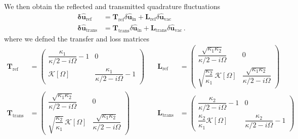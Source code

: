 We then obtain the reflected and transmitted quadrature fluctuations 
\begin{equation}
\begin{split}
\mathbf{\delta \hat{u}_{\mathrm{ref}}} &= 
\mathbf{T}_{\mathrm{ref}}
\delta\hat{\mathbf u}_{\mathrm{in}} + 
\mathbf{L}_{\mathrm{ref}}
\delta\hat{\mathbf u}_{\mathrm{vac}} \, \\ 
\mathbf{\delta \hat{u}_{\mathrm{trans}}} &= \mathbf{T}_{\mathrm{trans}}  \delta\hat{\mathbf u}_{\mathrm{in}} +
\mathbf{L}_{\mathrm{trans}}
\delta\hat{\mathbf u}_{\mathrm{vac}} \, .
\end{split}
\end{equation}
 where we defned the transfer and loss  matrices 
\begin{equation*}
  \begin{alignedat}{3}
     \mathbf{T}_{\mathrm{ref}} &=\begin{pmatrix}
  \dfrac{\kappa_1}{\kappa/2-i\Omega}  -1  & 0 \\
  \mathcal{K}[\Omega]  &  \dfrac{\kappa_1}{\kappa/2-i\Omega}  -1 
\end{pmatrix}  \quad
 & \mathbf{L}_{\mathrm{ref}} &= \begin{pmatrix}
   \dfrac{ \sqrt{\kappa_1 \kappa_2}}{\kappa/2-i\Omega}   & 0 \\
  \sqrt{\dfrac{\kappa_2}{\kappa_1}} \, \mathcal{K}[\Omega] &   \dfrac{ \sqrt{\kappa_1 \kappa_2}}{\kappa/2-i\Omega}  
\end{pmatrix} \\
        \mathbf{T}_{\mathrm{trans}} &=  \begin{pmatrix}
   \dfrac{ \sqrt{\kappa_1 \kappa_2}}{\kappa/2-i\Omega}   & 0 \\
  \sqrt{\dfrac{\kappa_2}{\kappa_1}} \, \mathcal{K}[\Omega] &   \dfrac{ \sqrt{\kappa_1 \kappa_2}}{\kappa/2-i\Omega}  
\end{pmatrix}  \quad 
& \mathbf{L}_{\mathrm{trans}}&= \begin{pmatrix}
  \dfrac{\kappa_2}{\kappa/2-i\Omega}  -1  & 0 \\
  \dfrac{\kappa_2}{\kappa_1}\mathcal{K}[\Omega]  &  \dfrac{\kappa_2}{\kappa/2-i\Omega}  -1 
\end{pmatrix} 
  \end{alignedat}
\end{equation*}


